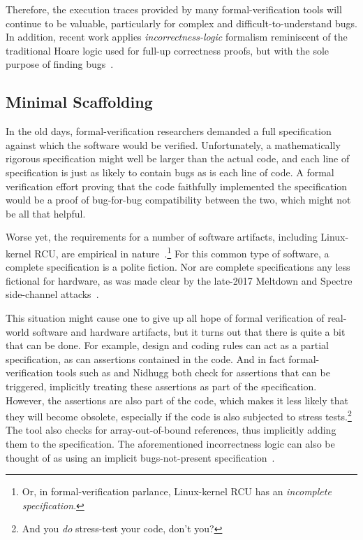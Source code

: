 Therefore, the execution traces provided
by many formal-verification tools will continue to be valuable,
particularly for complex and difficult-to-understand bugs.
In addition, recent work applies \emph{incorrectness-logic}
formalism reminiscent of the traditional Hoare logic used for
full-up correctness proofs, but with the sole purpose of finding
bugs~\cite{PeterWOHearn2019incorrectnessLogic}.

\subsection{Minimal Scaffolding}
\label{sec:future:Minimal Scaffolding}

In the old days, formal-verification researchers demanded a full
specification against which the software would be verified.
Unfortunately, a mathematically rigorous specification might well
be larger than the actual code, and each line of specification
is just as likely to contain bugs as is each line of code.
A formal verification effort proving that the code faithfully implemented
the specification would be a proof of bug-for-bug compatibility between
the two, which might not be all that helpful.

Worse yet, the requirements for a number of software artifacts,
including Linux-kernel RCU, are empirical in
nature~\cite{PaulEMcKenney2015RCUreqts1,PaulEMcKenney2015RCUreqts2,PaulEMcKenney2015RCUreqts3}.\footnote{
	Or, in formal-verification parlance, Linux-kernel RCU has an
	\emph{incomplete specification}.}
For this common type of software, a complete specification is a
polite fiction.
Nor are complete specifications any less fictional for hardware,
as was made clear by the late-2017 Meltdown and Spectre side-channel
attacks~\cite{JannHorn2018MeltdownSpectre}.

This situation might cause one to give up all hope of formal verification
of real-world software and hardware artifacts, but it turns out that there is
quite a bit that can be done.
For example, design and coding rules can act as a partial specification,
as can assertions contained in the code.
And in fact formal-verification tools such as  and Nidhugg
both check for assertions that can be triggered, implicitly treating
these assertions as part of the specification.
However, the assertions are also part of the code, which makes it less
likely that they will become obsolete, especially if the code is
also subjected to stress tests.\footnote{
	And you \emph{do} stress-test your code, don't you?}
The  tool also checks for array-out-of-bound references,
thus implicitly adding them to the specification.
The aforementioned incorrectness logic can also be thought of as using
an implicit bugs-not-present
specification~\cite{PeterWOHearn2019incorrectnessLogic}.

